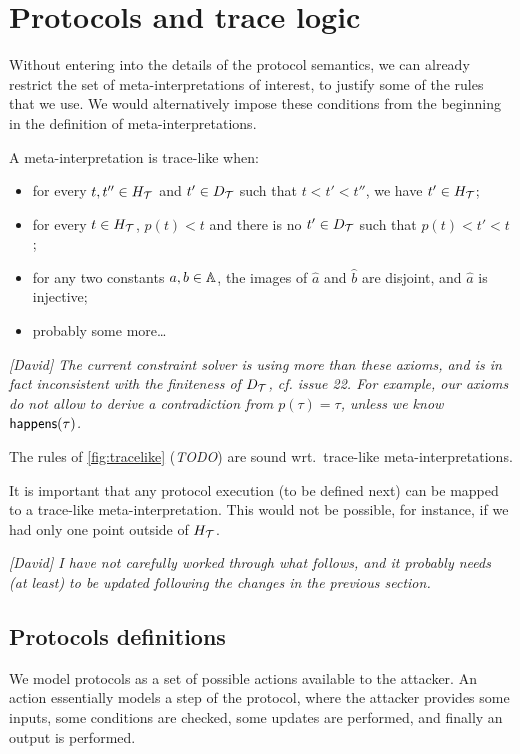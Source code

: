 \section{Protocols and trace logic}

Without entering into the details of the protocol semantics, we can already
restrict the set of meta-interpretations of interest, to justify some of the
rules that we use. We would alternatively impose these conditions from the
beginning in the definition of meta-interpretations.

\begin{definition}
A meta-interpretation is trace-like when:
\begin{itemize}
\item for every $t,t''\in H_{\mathcal{T}}$ and $t'\in D_{\mathcal{T}}$
  such that $t<t'<t''$, we have $t'\in H_{\mathcal{T}}$;
\item for every $t\in H_{\mathcal{T}}$, $p(t) < t$ and there
is no $t'\in D_{\mathcal{T}}$ such that $p(t)<t'<t$;
\item for any two constants $a,b\in\mathbb{A}$,
  the images of $\hat{a}$ and $\hat{b}$ are disjoint,
  and $\hat{a}$ is injective;
\item probably some more\ldots
\end{itemize}
\end{definition}

\emph{[David] The current constraint solver is using more than these
  axioms, and is in fact inconsistent with the finiteness of $D_{\mathcal{T}}$,
  cf. issue 22.
  For example, our axioms do not allow to derive a contradiction from
  $p(\tau)=\tau$, unless we know $\textsf{happens}(\tau)$.}

\begin{proposition}
The rules of \cref{fig:tracelike} (\emph{TODO})
are sound wrt.\ trace-like meta-interpretations.
\end{proposition}

It is important that any protocol execution (to be defined next) can be
mapped to a trace-like meta-interpretation. This would not be possible,
for instance, if we had only one point outside of $H_{\mathcal{T}}$.

\emph{[David] I have not carefully worked through what follows, and it
probably needs (at least) to be updated following the changes in the previous
section.}

\subsection{Protocols definitions}
We  model protocols as a set of possible actions available to the
attacker. An action essentially models a step of the protocol, where
the attacker provides some inputs, some conditions are checked, some
updates are performed, and finally an output is performed.

